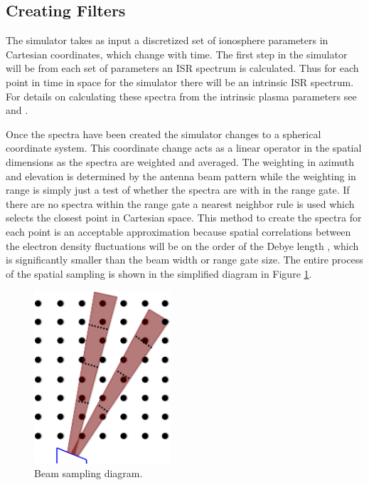 \documentclass[draft,ras]{agutex}
\begin{document}
\begin{article}
\subsection{Creating Filters}

The simulator takes as input a discretized set of ionosphere parameters in Cartesian coordinates, which change with time. The first step in the simulator will be from each set of parameters an ISR spectrum is calculated. Thus for each point in time in space for the simulator there will be an intrinsic ISR spectrum. For details on calculating these spectra from the intrinsic plasma parameters see \citet{kudeki:milla:1} and \citet{kudeki:milla:2}. 

Once the spectra have been created the simulator changes to a spherical coordinate system. This coordinate change acts as a linear operator in the spatial dimensions as the spectra are weighted and averaged. The weighting in azimuth and elevation is determined by the antenna beam pattern while the weighting in range is simply just a test of whether the spectra are with in the range gate. If there are no spectra within the range gate a nearest neighbor rule is used which selects the closest point in Cartesian space. This method to create the spectra for each point is an acceptable approximation because spatial correlations between the electron density fluctuations will be on the order of the Debye length \citep{farley1969}, which is significantly smaller than the beam width or range gate size. The entire process of the spatial sampling is shown in the simplified diagram in Figure \ref{fig:beamdia}.

\begin{figure}[!t]
\centering
\includegraphics[width=2in]{beamsampling}
\caption{Beam sampling diagram.}
\label{fig:beamdia}
\end{figure}
 


\end{article}
\end{document}
